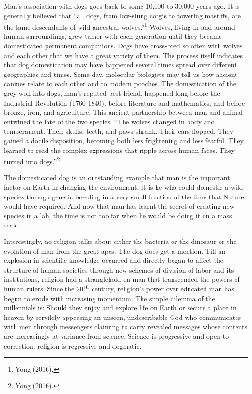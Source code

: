 \begin{multicols}{2}
Man's association with dogs goes back to some 10,000 to 30,000 years ago. It is generally believed that “all dogs, from low-slung corgis to towering mastiffs, are the tame descendants of wild ancestral wolves.”\footnote{Yong (2016).} Wolves, living in and around human surroundings, grew tamer with each generation until they became domesticated permanent companions. Dogs have cross-bred so often with wolves and each other that we have a great variety of them. The process itself indicates that dog domestication may have happened several times spread over different geographies and times. Some day, molecular biologists may tell us how ancient canines relate to each other and to modern pooches. The domestication of the grey wolf into dogs, man's reputed best friend, happened long before the Industrial Revolution (1760-1840), before literature and mathematics, and before bronze, iron, and agriculture. This ancient partnership between man and animal entwined the fate of the two species. “The wolves changed in body and temperament. Their skulls, teeth, and paws shrank. Their ears flopped. They gained a docile disposition, becoming both less frightening and less fearful. They learned to read the complex expressions that ripple across human faces. They turned into dogs.”\footnote{Yong (2016).}

The domesticated dog is an outstanding example that man is the important factor on Earth in changing the environment. It is he who could domestic a wild species through genetic breeding in a very small fraction of the time that Nature would have required. And now that man has learnt the secret of creating new species in a lab, the time is not too far when he would be doing it on a mass scale.

Interestingly, no religion talks about either the bacteria or the dinosaur or the evolution of man from the great apes. The dog does get a mention. Till an explosion in scientific knowledge occurred and directly began to affect the structure of human societies through new schemes of division of labor and its institutions, religion had a stranglehold on man that transcended the powers of human rulers. Since the 20$^{\rm{ th}}$ century, religion's power over educated man has begun to erode with increasing momentum. The simple dilemma of the millennials is: Should they enjoy and explore life on Earth or secure a place in heaven by servilely appeasing an unseen, undescribable God who communicates with men through messengers claiming to carry revealed messages whose contents are increasingly at variance from science. Science is progressive and open to correction, religion is regressive and dogmatic.


\end{multicols}
